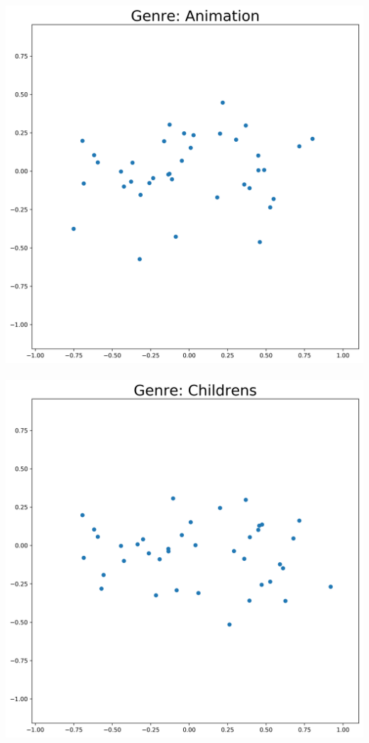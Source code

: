 \begin{appendices}
\includegraphics[scale=0.26]{"genres/Genre: Animation"} \\ \\
\includegraphics[scale=0.26]{"genres/Genre: Childrens"}  

\end{appendices}
